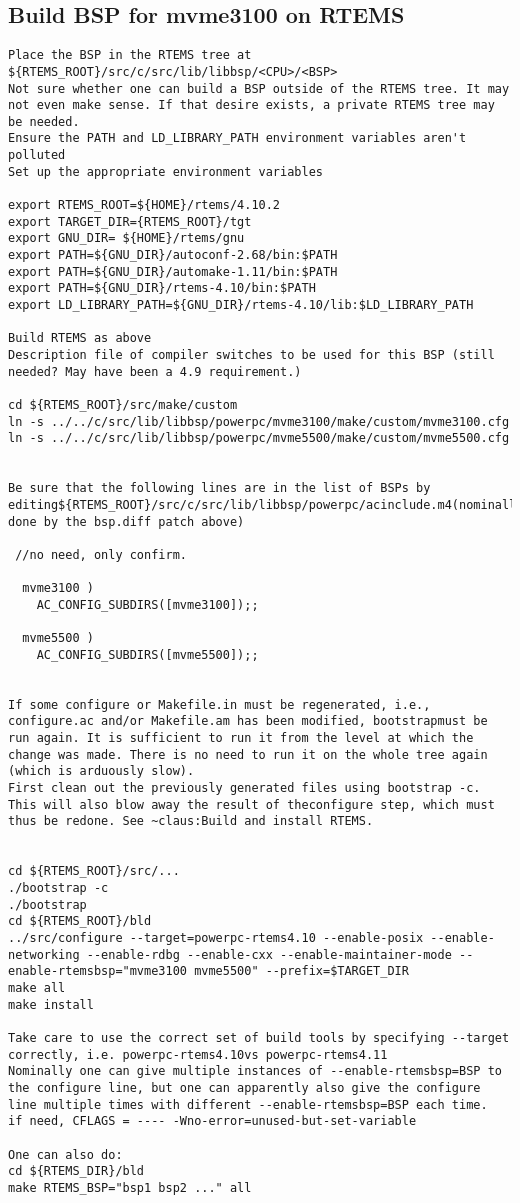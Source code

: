\documentclass[11pt
  , a4paper
  , article
  , oneside
]{memoir}
\begin{document}
\subsection*{Build BSP for mvme3100 on RTEMS}
\begin{lstlisting}[style=termstyle]
Place the BSP in the RTEMS tree at ${RTEMS_ROOT}/src/c/src/lib/libbsp/<CPU>/<BSP>
Not sure whether one can build a BSP outside of the RTEMS tree. It may not even make sense. If that desire exists, a private RTEMS tree may be needed.
Ensure the PATH and LD_LIBRARY_PATH environment variables aren't polluted
Set up the appropriate environment variables

export RTEMS_ROOT=${HOME}/rtems/4.10.2
export TARGET_DIR={RTEMS_ROOT}/tgt
export GNU_DIR= ${HOME}/rtems/gnu
export PATH=${GNU_DIR}/autoconf-2.68/bin:$PATH
export PATH=${GNU_DIR}/automake-1.11/bin:$PATH
export PATH=${GNU_DIR}/rtems-4.10/bin:$PATH
export LD_LIBRARY_PATH=${GNU_DIR}/rtems-4.10/lib:$LD_LIBRARY_PATH

Build RTEMS as above
Description file of compiler switches to be used for this BSP (still needed? May have been a 4.9 requirement.)

cd ${RTEMS_ROOT}/src/make/custom
ln -s ../../c/src/lib/libbsp/powerpc/mvme3100/make/custom/mvme3100.cfg
ln -s ../../c/src/lib/libbsp/powerpc/mvme5500/make/custom/mvme5500.cfg


Be sure that the following lines are in the list of BSPs by editing${RTEMS_ROOT}/src/c/src/lib/libbsp/powerpc/acinclude.m4(nominally done by the bsp.diff patch above)
                  
 //no need, only confirm.
  
  mvme3100 )
    AC_CONFIG_SUBDIRS([mvme3100]);;
  
  mvme5500 )
	AC_CONFIG_SUBDIRS([mvme5500]);;


If some configure or Makefile.in must be regenerated, i.e., configure.ac and/or Makefile.am has been modified, bootstrapmust be run again. It is sufficient to run it from the level at which the change was made. There is no need to run it on the whole tree again (which is arduously slow).
First clean out the previously generated files using bootstrap -c. This will also blow away the result of theconfigure step, which must thus be redone. See ~claus:Build and install RTEMS.


cd ${RTEMS_ROOT}/src/...
./bootstrap -c
./bootstrap
cd ${RTEMS_ROOT}/bld
../src/configure --target=powerpc-rtems4.10 --enable-posix --enable-networking --enable-rdbg --enable-cxx --enable-maintainer-mode --enable-rtemsbsp="mvme3100 mvme5500" --prefix=$TARGET_DIR
make all
make install

Take care to use the correct set of build tools by specifying --target correctly, i.e. powerpc-rtems4.10vs powerpc-rtems4.11
Nominally one can give multiple instances of --enable-rtemsbsp=BSP to the configure line, but one can apparently also give the configure line multiple times with different --enable-rtemsbsp=BSP each time.
if need, CFLAGS = ---- -Wno-error=unused-but-set-variable

One can also do:
cd ${RTEMS_DIR}/bld
make RTEMS_BSP="bsp1 bsp2 ..." all

\end{lstlisting}
\end{document}
